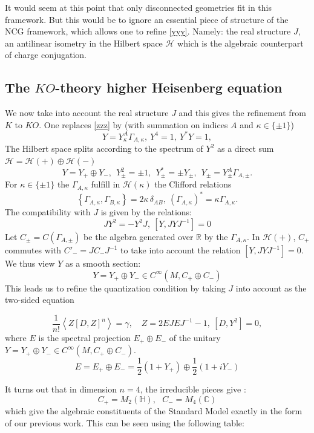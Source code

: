\documentclass[12pt]{article}
\def\R{{\mathbb R}}
\def\cH{{\mathcal H}}
\begin{document}
It would seem at this point that only disconnected geometries fit in this
framework.  But this would be to  ignore an essential piece of structure of the NCG
framework, which allows one to refine \eqref{yyy}. Namely: the real structure
$J$, an antilinear isometry in the Hilbert space $\cH$ which is the algebraic
counterpart of charge conjugation.

\subsection{The $KO$-theory higher Heisenberg equation}\label{sectKO}
We now take into account the real structure 
 $J$ and this gives the refinement  from  $K$ to $KO$.  One 
 replaces \eqref{zzz} by (with summation on indices $A$ and $\kappa\in \{\pm 1\}$) 
 \begin{equation}\label{xxx}
 	Y=Y^{A}_{\kappa}\Gamma_{A,\kappa}, \ Y^4=1,\ Y^*Y=1, 
 \end{equation}
The Hilbert space splits according to the spectrum of $Y^2$ as a direct sum $\cH=\cH(+)\oplus \cH(-)$ 
$$
Y=Y_{+}\oplus Y_{-}, \ \ Y_{\pm}^2=\pm 1, \ \ Y_{\pm}^*=\pm Y_{\pm},
\ \
Y_{\pm}=Y^{A}_{\pm}\Gamma_{A,\pm}.
$$
For $\kappa\in \{\pm 1\}$ the $\Gamma_{A,\kappa}$ fulfill in $\cH(\kappa)$ the Clifford relations
$$
\left\{  \Gamma_{A,\kappa},\Gamma_{B,\kappa}\right\}
=2\kappa\,\delta_{AB},\ (\Gamma_{A,\kappa})^{\ast}=\kappa\Gamma_{A,\kappa}.
$$
The compatibility with  $J$ is given by the relations:
 $$
 JY^2=-Y^2J, \ [Y,JYJ^{-1}]=0
 $$
Let $C_{\pm}=C(\Gamma_{A,\pm})$ be the algebra generated over $\R$ by the $\Gamma_{A,\kappa}$. 
In $\cH(+)$, $C_+$ commutes with $C'_-=JC_-J^{-1}$ to take into account the relation $[Y,JYJ^{-1}]=0$. We thus view $Y$ as a smooth section:
 $$Y=Y_{+}\oplus Y_{-}\in C^{\infty}(M,C_{+}\oplus C_{-})$$
This leads us to refine the quantization
condition by taking $J$ into account as the two-sided equation

\begin{equation}
\frac{1}{n!}\left\langle Z\left[  D,Z\right]^n  \right\rangle
=\gamma,\quad Z=2EJEJ^{-1}-1,\ [D,Y^2]=0,\label{jqq}
\end{equation}
where $E$ is the spectral projection $E_{+}\oplus E_{-}$ of the unitary 
$Y=Y_{+}\oplus Y_{-}\in C^{\infty}(M,C_{+}\oplus C_{-})$.   $$E=E_{+}\oplus E_{-}=\frac{1}{2}(1+Y_{+})\oplus\frac{1}{2}(1+iY_{-})$$

It turns out  that in dimension $n=4$,  the irreducible pieces  give :
$$C_{+}=M_{2}(\mathbb{H}),\  \  \  C_{-}=M_{4}(\mathbb{C})$$
 which give the algebraic constituents of the Standard Model
exactly in the form of our previous work. This can be seen using the following table:
\end{document}
